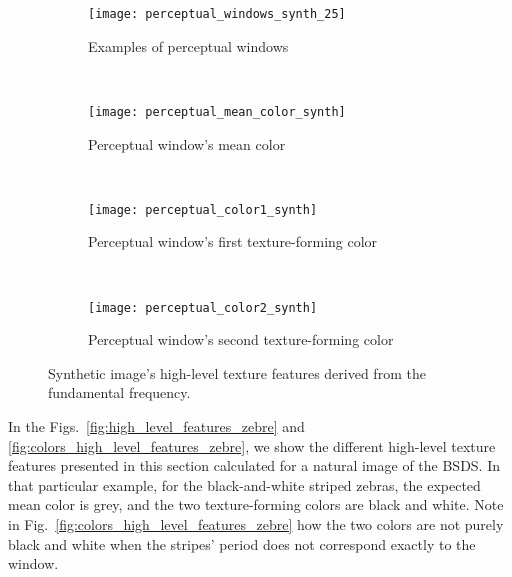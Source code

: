 \begin{figure}[!ht]
    \centering
    \begin{subfigure}[b]{\textwidth}
    	\texttt{[image: perceptual\_windows\_synth\_25]}
        \caption{Examples of perceptual windows}
        \label{fig:perceptual_windows_synth_25}
    \end{subfigure}\\
    \begin{subfigure}[b]{\textwidth}
    	\texttt{[image: perceptual\_mean\_color\_synth]}
        \caption{Perceptual window's mean color}
        \label{fig:perceptual_mean_color_synth}
    \end{subfigure}\\
    \begin{subfigure}[b]{\textwidth}
    	\texttt{[image: perceptual\_color1\_synth]}
        \caption{Perceptual window's first texture-forming color}
        \label{fig:perceptual_color1_synth}
    \end{subfigure}\\
    \begin{subfigure}[b]{\textwidth}
    	\texttt{[image: perceptual\_color2\_synth]}
        \caption{Perceptual window's second texture-forming color}
        \label{fig:perceptual_color2_synth}
    \end{subfigure}    
                  
    \caption{Synthetic image's high-level texture features derived from the fundamental frequency.}\label{fig:colors_high_level_features_synth}    
\end{figure}


In the Figs.\ \ref{fig:high_level_features_zebre} and \ref{fig:colors_high_level_features_zebre}, we show the different high-level texture features presented in this section calculated for a natural image of the BSDS. In that particular example, for the black-and-white striped zebras, the expected mean color is grey, and the two texture-forming colors are black and white. Note in Fig.\ \ref{fig:colors_high_level_features_zebre} how the two colors are not purely black and white when the stripes' period does not correspond exactly to the window.

